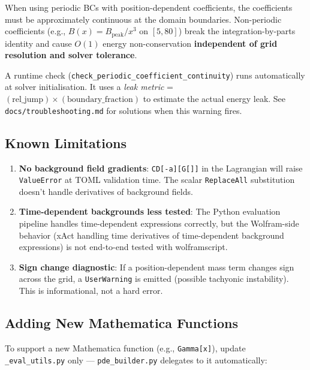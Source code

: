 When using periodic BCs with position-dependent coefficients, the
coefficients must be approximately continuous at the domain boundaries.
Non-periodic coefficients (e.g., $B(x) = B_\mathrm{peak}/x^3$ on $[5, 80]$)
break the integration-by-parts identity and cause $O(1)$ energy
non-conservation \textbf{independent of grid resolution and solver tolerance}.

A runtime check (\texttt{check\_periodic\_coefficient\_continuity}) runs
automatically at solver initialisation. It uses a \emph{leak metric} =
$(\text{rel\_jump}) \times (\text{boundary\_fraction})$ to estimate the actual energy leak.
See \texttt{docs/troubleshooting.md} for solutions when this warning fires.

\subsection{Known Limitations}
\label{sec:bg-limitations}

\begin{enumerate}
  \item \textbf{No background field gradients}: \texttt{CD[-a][G[]]} in the Lagrangian will raise
    \texttt{ValueError} at TOML validation time. The scalar \texttt{ReplaceAll} substitution
    doesn't handle derivatives of background fields.

  \item \textbf{Time-dependent backgrounds less tested}: The Python evaluation pipeline
    handles time-dependent expressions correctly, but the Wolfram-side behavior
    (xAct handling time derivatives of time-dependent background expressions)
    is not end-to-end tested with wolframscript.

  \item \textbf{Sign change diagnostic}: If a position-dependent mass term changes sign
    across the grid, a \texttt{UserWarning} is emitted (possible tachyonic instability).
    This is informational, not a hard error.
\end{enumerate}

\subsection{Adding New Mathematica Functions}
\label{sec:bg-new-functions}

To support a new Mathematica function (e.g., \texttt{Gamma[x]}), update
\texttt{\_eval\_utils.py} only --- \texttt{pde\_builder.py} delegates to it automatically:

